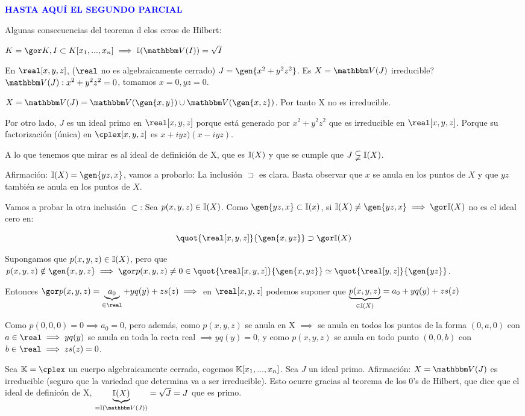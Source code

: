 \textcolor{blue}{\textbf{HASTA AQUÍ EL SEGUNDO PARCIAL}}

Algunas consecuencias del teorema d elos ceros de Hilbert:

$K=\cls{K}, I\subset K[x_1,...,x_n] \implies \I(\V(I))=\sqrt{I}$

\begin{example}
	En $\real[x,y,z]$, ($\real$ no es algebraicamente cerrado) $J=\gen{x^2+y^2z^2}$. Es $X=\V(J)$ irreducible? $\V(J):x^2+y^2z^2=0$, tomamos $x=0, yz=0$.

	$X=\V(J)=\V(\gen{x,y})\cup\V(\gen{x,z})$. Por tanto X no es irreducible.

	Por otro lado, $J$ es un ideal primo en $\real[x,y,z]$ porque está generado por $x^2+y^2z^2$ que es irreducible en $\real[x,y,z]$. Porque su factorización (única) en $\cplex[x,y,z]$ es $x+iyz)(x-iyz)$.

	A lo que tenemos que mirar es al ideal de definición de X, que es $\mathbb{I}(X)$ y que se cumple que $J \subsetneqq \mathbb{I}(X)$.

	Afirmación: $ \I(X)=\gen{yz,x}$, vamos a probarlo:
	La inclusión $\supset$ es clara. Basta observar que $x$ se anula en los puntos de $X$ y que $yz$ también se anula en los puntos de $X$.

	Vamos a probar la otra inclusión $\subset$: Sea $p(x,y,z) \in \mathbb{I}(X)$. Como $\gen{yz,x} \subset \I(x)$, si $\I(X) \neq \gen{yz,x} \implies \cls{\I(X)}$ no es el ideal cero en:

	$$ \quot{\real[x,y,z]}{\gen{x,yz}} \supset \cls{\I(X)} $$

	Supongamos que $p(x,y,z) \in \mathbb{I}(X)$, pero que $p(x,y,z) \notin \gen{x,y,z} \implies \cls{p(x,y,z)} \neq 0 \in \quot{\real[x,y,z]}{\gen{x,yz}} \simeq \quot{\real[y,z]}{\gen{yz}}$.

	Entonces $\cls{p(x,y,z)}=\underbrace{a_0}_{\in \real}+yq(y)+zs(z) \implies$ en $\real[x,y,z]$ podemos suponer que $\underbrace{p(x,y,z)}_{\in \mathbb{I}(X)}=a_0+yq(y)+zs(z)$

	Como $p(0,0,0)=0 \implies a_0=0$, pero además, como $p(x,y,z)$ se anula en X $\implies$ se anula en todos los puntos de la forma $(0,a,0)$ con $a\in \real \implies yq(y)$ se anula en toda la recta real $\implies yq(y)=0$, y como $p(x,y,z)$ se anula en todo punto $(0,0,b)$ con $b\in \real \implies zs(z)=0$.
\end{example}


\begin{example}
	Sea $\K=\cplex$ un cuerpo algebraicamente cerrado, cogemos $\mathbb{K}[x_1,...,x_n]$. Sea $J$ un ideal primo. Afirmación: $X=\V(J)$ es irreducible (seguro que la variedad que determina va a ser irreducible). Esto ocurre gracias al teorema de los 0's de Hilbert, que dice que el ideal de definicón de X, $\underbrace{\I(X)}_{=\I(\V(J))}=\sqrt{J}=J$ que es primo.
\end{example}

